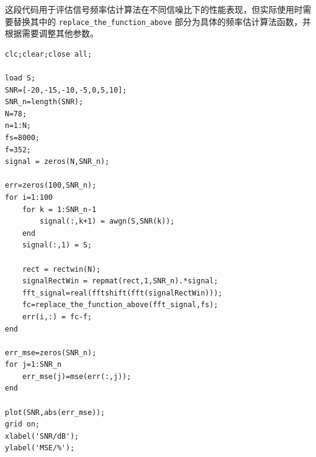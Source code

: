 \documentclass[a4paper,12pt]{article}
\begin{document}
这段代码用于评估信号频率估计算法在不同信噪比下的性能表现，但实际使用时需要替换其中的 \texttt{replace\_the\_function\_above} 部分为具体的频率估计算法函数，并根据需要调整其他参数。

\begin{lstlisting}
clc;clear;close all;

load S;
SNR=[-20,-15,-10,-5,0,5,10];
SNR_n=length(SNR);
N=78;
n=1:N;
fs=8000;
f=352;
signal = zeros(N,SNR_n);

err=zeros(100,SNR_n);
for i=1:100
    for k = 1:SNR_n-1
        signal(:,k+1) = awgn(S,SNR(k));
    end
    signal(:,1) = S;

    rect = rectwin(N);
    signalRectWin = repmat(rect,1,SNR_n).*signal; 
    fft_signal=real(fftshift(fft(signalRectWin)));
    fc=replace_the_function_above(fft_signal,fs);
    err(i,:) = fc-f;
end

err_mse=zeros(SNR_n);
for j=1:SNR_n
    err_mse(j)=mse(err(:,j));
end

plot(SNR,abs(err_mse));
grid on;
xlabel('SNR/dB');
ylabel('MSE/%');


\end{lstlisting}
\newpage


\end{document}
